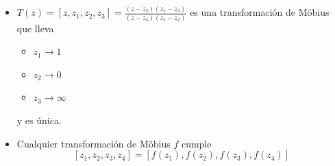 \documentclass[paper=a4, fontsize=11pt]{scrartcl}
\numberwithin{equation}{section}
\numberwithin{figure}{section}
\numberwithin{table}{section}
\begin{document}
\begin{itemize}
\item $T(z) = [z,z_1,z_2,z_3] = \frac{(z-z_2)(z_1-z_3)}{(z-z_3)(z_1-z_2)}$ es una transformación de Möbius que lleva
\begin{itemize}
\item $z_1\to1$
\item $z_2\to0$
\item $z_3\to\infty$
\end{itemize}
y es única.
\item Cualquier transformación de Möbius $f$ cumple
$$[z_1,z_2,z_3,z_4] = \left[f(z_1),f(z_2),f(z_3),f(z_4)\right]$$
\end{itemize}
\end{document}

